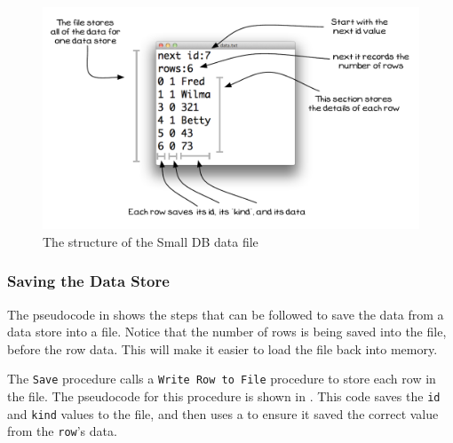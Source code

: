 \begin{figure}[h]
   \centering
   \includegraphics[width=\textwidth]{./topics/file-io/diagrams/RowFileStructure} 
   \caption{The structure of the Small DB data file}
   \label{fig:row-file-struct}
\end{figure}


\subsubsection{Saving the Data Store} %
\label{ssub:saving_the_data_store}

The pseudocode in  shows the steps that can be followed to save the data from a data store into a file. Notice that the number of rows is being saved into the file, before the row data. This will make it easier to load the file back into memory.


The \texttt{Save} procedure calls a \texttt{Write Row to File} procedure to store each row in the file. The pseudocode for this procedure is shown in . This code saves the \texttt{id} and \texttt{kind} values to the file, and then uses a  to ensure it saved the correct value from the \texttt{row}'s data.




